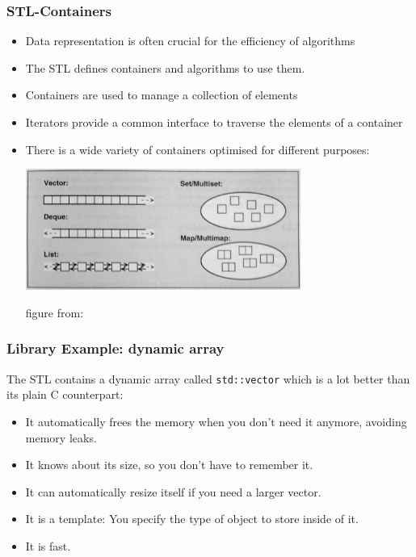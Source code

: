 \documentclass[aspectratio=169,ignorenonframetext,11pt]{beamer}
\def\inline{\lstinline[basicstyle=\small\ttfamily]}
\begin{document}
\begin{frame}
\frametitle{STL-Containers}

\begin{itemize}
\item Data representation is often crucial for the efficiency of algorithms
\item The STL defines containers and algorithms to use them.
\item Containers are used to manage a collection of elements
\item Iterators provide a common interface to traverse the elements of a container
\item There is a wide variety of containers optimised for different purposes:
\begin{center}
\includegraphics[width=9cm]{containers.jpg}

figure from: \cite{josuttis99:stl}
\end{center}
\end{itemize}

\end{frame}



\begin{frame}
  \frametitle{Library Example: dynamic array}
  The STL contains a dynamic array called \inline!std::vector! which is a lot better than its plain
  C counterpart:
  \begin{itemize}
  \item It automatically frees the memory when you don't need it anymore, avoiding memory leaks.
  \item It knows about its size, so you don't have to remember it.
  \item It can automatically resize itself if you need a larger vector.
  \item It is a template: You specify the type of object to store inside of it.
  \item It is fast.
  \end{itemize}
\end{frame}
\end{document}

